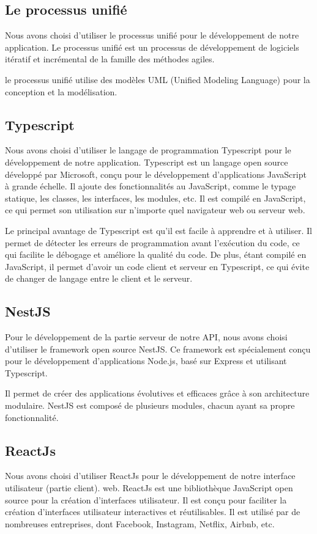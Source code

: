 \subsection*{Le processus unifié}\label{subsec: conception-unified-process}
Nous avons choisi d'utiliser le processus unifié pour le développement de
notre application. Le processus unifié est un processus de développement de
logiciels itératif et incrémental de la famille des méthodes agiles.

le processus unifié utilise des modèles UML (Unified Modeling Language) pour la
conception et la modélisation.

\subsection*{Typescript}\label{subsec: conception-typescript}
Nous avons choisi d'utiliser le langage de programmation Typescript pour le développement de notre application. Typescript est un langage open source développé par Microsoft, conçu pour le développement d'applications JavaScript à grande échelle. Il ajoute des fonctionnalités au JavaScript, comme le typage statique, les classes, les interfaces, les modules, etc. Il est compilé en JavaScript, ce qui permet son utilisation sur n'importe quel navigateur web ou serveur web.

Le principal avantage de Typescript est qu'il est facile à apprendre et à utiliser. Il permet de détecter les erreurs de programmation avant l'exécution du code, ce qui facilite le débogage et améliore la qualité du code. De plus, étant compilé en JavaScript, il permet d'avoir un code client et serveur en Typescript, ce qui évite de changer de langage entre le client et le serveur.
\subsection*{NestJS}\label{subsec: conception-nestjs}
Pour le développement de la partie serveur de notre API, nous avons choisi d'utiliser
le framework open source NestJS. Ce framework est spécialement conçu pour
le développement d'applications Node.js, basé sur Express et utilisant Typescript.

Il permet de créer des applications évolutives et efficaces grâce à son architecture
modulaire. NestJS est composé de plusieurs modules, chacun ayant sa propre fonctionnalité.

\subsection*{ReactJs}\label{subsec: conception-nextjs}
Nous avons choisi d'utiliser ReactJs pour le développement de notre interface utilisateur (partie client).
web. ReactJs est une bibliothèque JavaScript open source pour la création
d'interfaces utilisateur. Il est conçu pour faciliter la création d'interfaces
utilisateur interactives et réutilisables. Il est utilisé par de nombreuses
entreprises, dont Facebook, Instagram, Netflix, Airbnb, etc.

